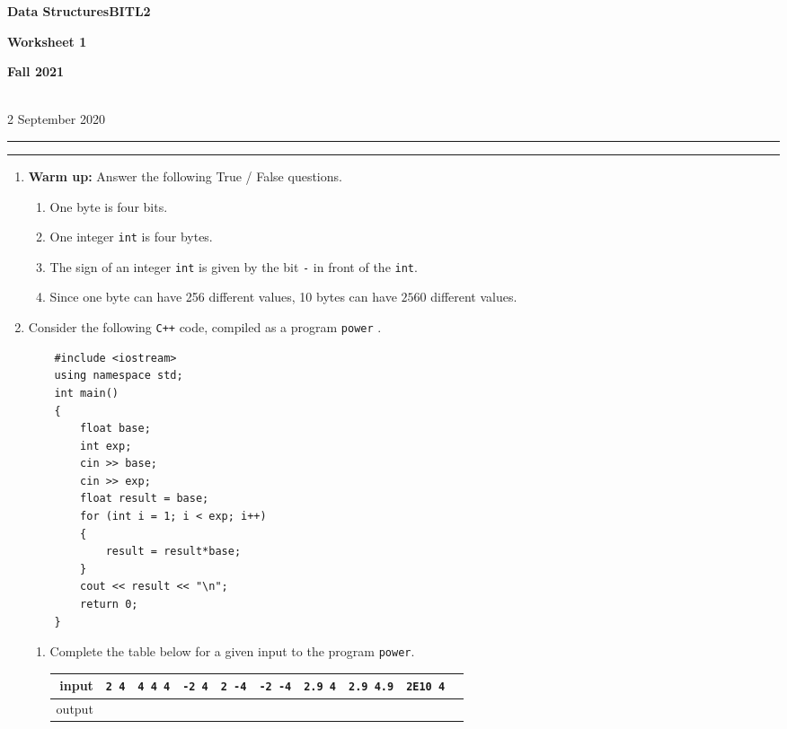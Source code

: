\documentclass[a4paper,12pt]{article}
\begin{document}
\begin{center}
\parbox{3.5cm}{\flushleft\bf Data Structures\linebreak BITL2} \hfill {\bf\Huge Worksheet 1} \hfill \parbox{3.5cm}{\flushright\bf Fall 2021} \\[8pt]
\rm\small 2 September 2020
\end{center}

\hrule\vspace{2pt}\hrule

\begin{enumerate}

\item \textbf{Warm up:} Answer the following True / False questions.
\begin{enumerate}
\item One byte is four bits.
\item One integer \texttt{int} is four bytes.
\item The sign of an integer \texttt{int} is given by the bit \texttt{-} in front of the \texttt{int}.
\item Since one byte can have 256 different values, 10 bytes can have $2560$ different values.
\end{enumerate}

\item Consider the following \texttt{C++} code, compiled as a program \texttt{power} .
{\fontsize{9}{10}\selectfont
\begin{verbatim}
    #include <iostream>
    using namespace std;
    int main() 
    {
        float base;
        int exp;
        cin >> base;
        cin >> exp;
        float result = base;
        for (int i = 1; i < exp; i++)
        {
            result = result*base;
        }
        cout << result << "\n";
        return 0;
    }
\end{verbatim}
}
\begin{enumerate}
\item Complete the table below for a given input to the program \texttt{power}.
\begin{center}
\renewcommand\arraystretch{1.5}
\begin{tabular}{|r|c|c|c|c|c|c|c|c|c|}
\hline input & \texttt{2\ 4} &  \texttt{4\ 4\ 4} & \texttt{-2\ 4} & \texttt{2\ -4} & \texttt{-2\ -4} & \texttt{2.9\ 4} & \texttt{2.9 4.9} & \texttt{2E10 4}\\
\hline output &&&&&&&& \\
\hline
\end{tabular}
\end{center}


\end{enumerate}
\end{enumerate}
\end{document}
